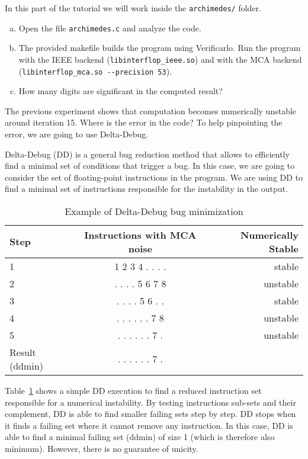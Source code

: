 In this part of the tutorial we will work inside the \texttt{archimedes/} folder.

\begin{question}
  \begin{enumerate}[(a)]
    \item Open the file \texttt{archimedes.c} and analyze the code.
    \item The provided makefile builds the program using Verificarlo. Run the program
      with the IEEE backend (\texttt{libinterflop\_ieee.so}) and with the MCA backend
      (\texttt{libinterflop\_mca.so -{}-precision 53}).
    \item How many digits are significant in the computed result?
  \end{enumerate}
\end{question}

The previous experiment shows that computation becomes numerically unstable
around iteration 15. Where is the error in the code? To help pinpointing the error,
we are going to use Delta-Debug.

Delta-Debug (DD) is a general bug reduction method that allows to efficiently find a
minimal set of conditions that trigger a bug. In this case, we are going to consider
the set of floating-point instructions in the program. We are using DD to
find a minimal set of instructions responsible for the instability in the output.

\begin{table}[h]
  \centering
  \begin{tabular}{lcr}
    Step & Instructions with MCA noise & Numerically Stable \\
    \midrule
    1    & 1 2 3 4 . . . . & stable \\
    2    & . . . . 5 6 7 8 & unstable \\
    \midrule
    3    & . . . . 5 6 . . & stable \\
    4    & . . . . . . 7 8 & unstable \\
    \midrule
    5    & . . . . . . 7 . & unstable \\
    Result (ddmin) & . . . . . . 7 . & \\
  \end{tabular}
  \caption{Example of Delta-Debug bug minimization\label{tab:deltadebug}}
\end{table}

Table~\ref{tab:deltadebug} shows a simple DD execution to find a reduced
instruction set responsible for a numerical instability. By testing
instructions sub-sets and their complement, DD is able to find smaller failing
sets step by step. DD stops when it finds a failing set where it cannot remove
any instruction. In this case, DD is able to find a minimal failing set (ddmin)
of size 1 (which is therefore also minimum). However, there is no guarantee of unicity.


